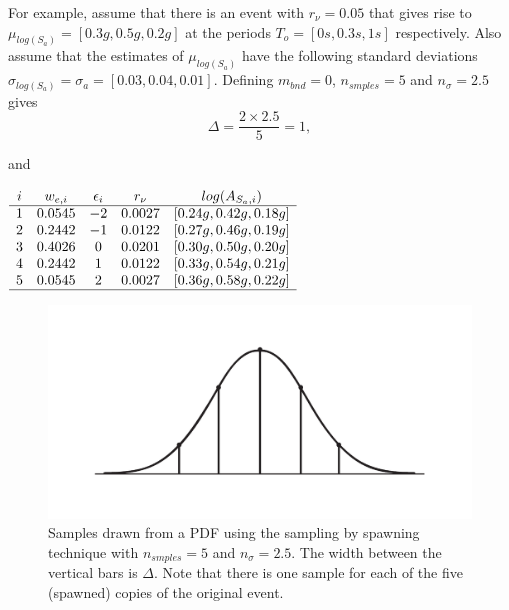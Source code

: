 For example, assume that there is an event with $r_\nu=0.05$ that
gives rise to \mbox{$\mu_{log(S_a)}=[0.3g, 0.5g, 0.2g]$} at the
periods \mbox{$T_o = [0s,0.3s,1s]$} respectively. Also assume that
the estimates of $\mu_{log(S_a)}$ have the following standard
deviations \mbox{$\sigma_{log(S_a)}=\sigma_a = [0.03,0.04,0.01]$}.
Defining $m_{bnd}=0$, $n_{smples}=5$ and $n_\sigma=2.5$ gives
\begin{equation}
\Delta = \frac{2 \times 2.5}{5} = 1,
\end{equation}

and

\begin{center} $ \begin{array}{ccccc}
i & w_{e,i} & \epsilon_i & r_\nu & log(A_{S_a,i}) \\
\hline
1 & 0.0545 & -2 & 0.0027 & [0.24g, 0.42g, 0.18g] \\
2 & 0.2442 & -1 & 0.0122 & [0.27g, 0.46g, 0.19g] \\
3 & 0.4026 & 0  & 0.0201 & [0.30g, 0.50g, 0.20g] \\
4 & 0.2442 & 1  & 0.0122 & [0.33g, 0.54g, 0.21g] \\
5 & 0.0545 & 2  & 0.0027 & [0.36g, 0.58g, 0.22g] \\
\hline
\end{array}$
\end{center}

\begin{figure}
\includegraphics[width=1\textwidth]{diags/fig-hattn-spawning}
\caption{Samples drawn from a PDF using the sampling by spawning
technique with $n_{smples}=5$ and $n_\sigma=2.5$. The width
between the vertical bars is $\Delta$. Note that there is one
sample for each of the five (spawned) copies of the original
event.} \label{fig:hattn-spawnsamp}
\end{figure}

